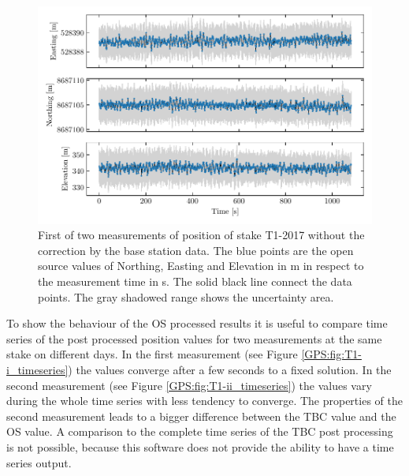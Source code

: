 \begin{figure}[H]
    \centering
    \includegraphics[width=\textwidth]{./figs/timeseries/46250700_org-T1-i-2017_Timeseries-east-north-elev.pdf}
    \caption{First of two measurements of position of stake T1-2017 without the correction by the base station data. The blue points are the open source values of Northing, Easting and Elevation in m in respect to the measurement time in s. The solid black line connect the data points. The gray shadowed range shows the uncertainty area.}
    \label{GPS:fig:T1-i_nocorr}
\end{figure}

To show the behaviour of the OS processed results it is useful to compare time series of the post processed position values for two measurements at the same stake on different days.
In the first measurement (see Figure \ref{GPS:fig:T1-i_timeseries}) the values converge after a few seconds to a fixed solution.
In the second measurement (see Figure \ref{GPS:fig:T1-ii_timeseries}) the values vary during the whole time series with less tendency to converge.
The properties of the second measurement leads to a bigger difference between the TBC value and the OS value.
A comparison to the complete time series of the TBC post processing is not possible, because this software does not provide the ability to have a time series output.

